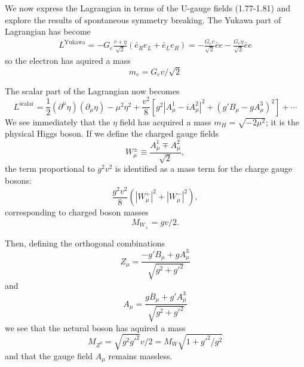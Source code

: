 We now express the Lagrangian in terms of the U-gauge fields (1.77-1.81) and explore the results of spontaneous symmetry breaking. The Yukawa part of Lagrangian has become
\begin{eqnarray}
L^\text{Yukawa} = -G_e\frac{v+\eta}{\sqrt{2}}(\bar{e}_R e_L+\bar{e}_L e_R)=-\frac{G_e v}{\sqrt{2}}\bar{e}e-\frac{G_e \eta}{\sqrt{2}}\bar{e}e
\end{eqnarray}
so the electron has aquired a mass
\begin{equation}
m_e = G_e v/\sqrt{2}
\end{equation}

The scalar part of the Lagrangian now becomes
\begin{equation}
L^\text{scalar} =\frac{1}{2}(\partial^\mu\eta)(\partial_\mu\eta)-\mu^2\eta^2+\frac{v^2}{8}[g^2|A^1_\mu-iA^2_\mu|^2+(g'B_\mu-gA_\mu^3)^2]+\cdots
\end{equation}
We see immediately that the $\eta$ field has acquired a mass $m_H=\sqrt{-2\mu^2}$; it is the physical Higgs boson. If we define the charged gauge fields
\begin{equation}
W_\mu^\pm\equiv \frac{A_\mu^1\mp A_\mu^2}{\sqrt{2}},
\end{equation}
the term proportional to $g^2 v^2$ is identified as a mass term for the charge gauge bosons:
\begin{equation}
\frac{g^2v^2}{8}(|W_\mu^+|^2+|W_\mu^-|^2),
\end{equation}
corresponding to charged boson masses
\begin{equation}
M_{W_\pm}=gv/2.
\end{equation}

Then, defining the orthogonal combinations
\begin{equation}
Z_\mu=\frac{-g'B_\mu+gA^3_\mu}{\sqrt{g^2+g'^2}}
\end{equation}
and
\begin{equation}
A_\mu=\frac{gB_\mu+g'A^3_\mu}{\sqrt{g^2+g'^2}}
\end{equation}
we see that the netural boson has aquired a mass
\begin{equation}
M_{Z^0}=\sqrt{g^2g'^2}v/2=M_W\sqrt{1+g'^2/g^2}
\end{equation}
and that the gauge field $A_\mu$ remains massless. 


